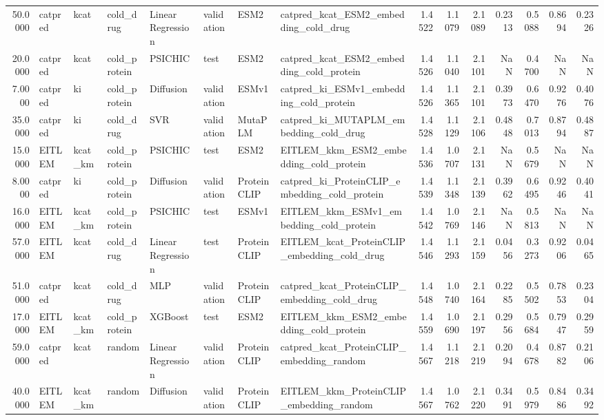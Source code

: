 \begin{tabular}{rlllllllrrrrrrr}
50.0000 & catpred & kcat & cold_drug & Linear Regression & validation & ESM2 & catpred_kcat_ESM2_embedding_cold_drug & 1.4522 & 1.1079 & 2.1089 & 0.2313 & 0.5088 & 0.8694 & 0.2326 \\
20.0000 & catpred & kcat & cold_protein & PSICHIC & test & ESM2 & catpred_kcat_ESM2_embedding_cold_protein & 1.4526 & 1.1040 & 2.1101 & NaN & 0.4700 & NaN & NaN \\
7.0000 & catpred & ki & cold_protein & Diffusion & validation & ESMv1 & catpred_ki_ESMv1_embedding_cold_protein & 1.4526 & 1.1365 & 2.1101 & 0.3973 & 0.6470 & 0.9276 & 0.4076 \\
35.0000 & catpred & ki & cold_drug & SVR & validation & MutaPLM & catpred_ki_MUTAPLM_embedding_cold_drug & 1.4528 & 1.1129 & 2.1106 & 0.4848 & 0.7013 & 0.8794 & 0.4887 \\
15.0000 & EITLEM & kcat_km & cold_protein & PSICHIC & test & ESM2 & EITLEM_kkm_ESM2_embedding_cold_protein & 1.4536 & 1.0707 & 2.1131 & NaN & 0.5679 & NaN & NaN \\
8.0000 & catpred & ki & cold_protein & Diffusion & validation & ProteinCLIP & catpred_ki_ProteinCLIP_embedding_cold_protein & 1.4539 & 1.1348 & 2.1139 & 0.3962 & 0.6495 & 0.9246 & 0.4041 \\
16.0000 & EITLEM & kcat_km & cold_protein & PSICHIC & test & ESMv1 & EITLEM_kkm_ESMv1_embedding_cold_protein & 1.4542 & 1.0769 & 2.1146 & NaN & 0.5813 & NaN & NaN \\
57.0000 & EITLEM & kcat & cold_drug & Linear Regression & test & ProteinCLIP & EITLEM_kcat_ProteinCLIP_embedding_cold_drug & 1.4546 & 1.1293 & 2.1159 & 0.0456 & 0.3273 & 0.9206 & 0.0465 \\
51.0000 & catpred & kcat & cold_drug & MLP & validation & ProteinCLIP & catpred_kcat_ProteinCLIP_embedding_cold_drug & 1.4548 & 1.0740 & 2.1164 & 0.2285 & 0.5502 & 0.7853 & 0.2304 \\
17.0000 & EITLEM & kcat_km & cold_protein & XGBoost & test & ESM2 & EITLEM_kkm_ESM2_embedding_cold_protein & 1.4559 & 1.0690 & 2.1197 & 0.2956 & 0.5684 & 0.7947 & 0.2959 \\
59.0000 & catpred & kcat & random & Linear Regression & validation & ProteinCLIP & catpred_kcat_ProteinCLIP_embedding_random & 1.4567 & 1.1218 & 2.1219 & 0.2094 & 0.4678 & 0.8782 & 0.2106 \\
40.0000 & EITLEM & kcat_km & random & Diffusion & validation & ProteinCLIP & EITLEM_kkm_ProteinCLIP_embedding_random & 1.4567 & 1.0762 & 2.1220 & 0.3491 & 0.5979 & 0.8486 & 0.3492 \\

\end{tabular}
